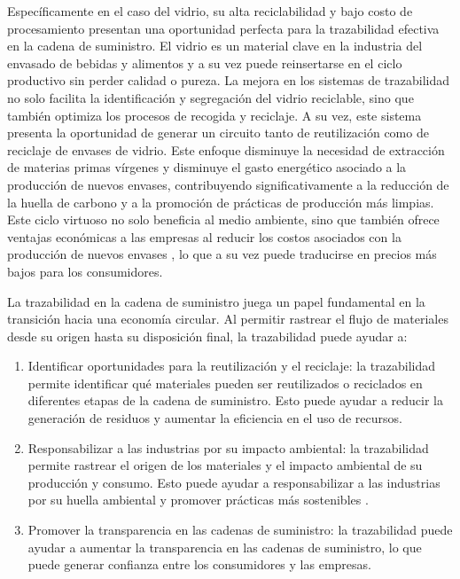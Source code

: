 \documentclass[main.tex]{subfiles}
\begin{document}
Específicamente en el caso del vidrio, su alta reciclabilidad y bajo costo de procesamiento \cite{prodvidrio2024verallia} presentan una oportunidad perfecta para la trazabilidad efectiva en la cadena de suministro. El vidrio es un material clave en la industria del envasado de bebidas y alimentos y a su vez puede reinsertarse en el ciclo productivo sin perder calidad o pureza. La mejora en los sistemas de trazabilidad no solo facilita la identificación y segregación del vidrio reciclable, sino que también optimiza los procesos de recogida y reciclaje. A su vez, este sistema presenta la oportunidad de generar un circuito tanto de reutilización como de reciclaje de envases de vidrio. Este enfoque disminuye la necesidad de extracción de materias primas vírgenes y disminuye el gasto energético asociado a la producción de nuevos envases, contribuyendo significativamente a la reducción de la huella de carbono y a la promoción de prácticas de producción más limpias. Este ciclo virtuoso no solo beneficia al medio ambiente, sino que también ofrece ventajas económicas a las empresas al reducir los costos asociados con la producción de nuevos envases  \cite{prodvidrio2024verallia}, lo que a su vez puede traducirse en precios más bajos para los consumidores.

La trazabilidad en la cadena de suministro juega un papel fundamental en la transición hacia una economía circular. Al permitir rastrear el flujo de materiales desde su origen hasta su disposición final, la trazabilidad puede ayudar a:

\begin{enumerate}
	\item Identificar oportunidades para la reutilización y el reciclaje: la trazabilidad permite identificar qué materiales pueden ser reutilizados o reciclados en diferentes etapas de la cadena de suministro. Esto puede ayudar a reducir la generación de residuos y aumentar la eficiencia en el uso de recursos.

	\item Responsabilizar a las industrias por su impacto ambiental: la trazabilidad permite rastrear el origen de los materiales y el impacto ambiental de su producción y consumo. Esto puede ayudar a responsabilizar a las industrias por su huella ambiental y promover prácticas más sostenibles \cite{melendez2021economia}.

	\item Promover la transparencia en las cadenas de suministro: la trazabilidad puede ayudar a aumentar la transparencia en las cadenas de suministro, lo que puede generar confianza entre los consumidores y las empresas.
\end{enumerate}
\end{document}
